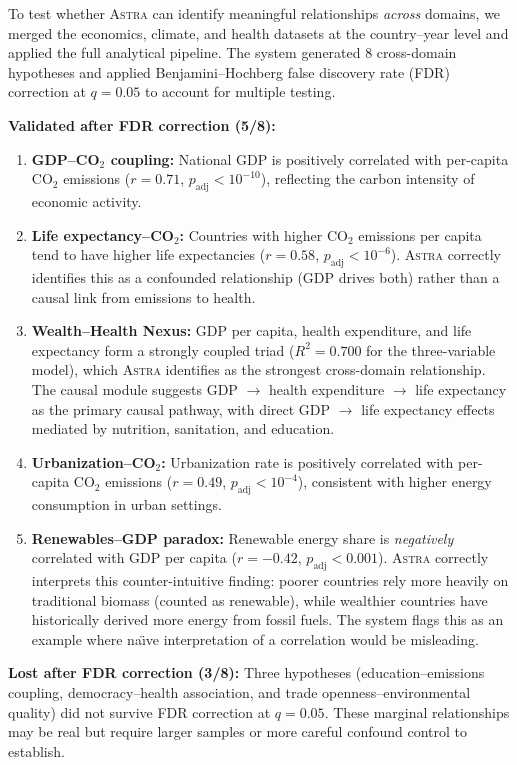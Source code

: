 \documentclass[usenatbib]{rasti}
\newcommand{\astra}{\textsc{Astra}\xspace}
\begin{document}
To test whether \astra can identify meaningful relationships \emph{across} domains, we merged the economics, climate, and health datasets at the country--year level and applied the full analytical pipeline. The system generated 8 cross-domain hypotheses and applied Benjamini--Hochberg false discovery rate (FDR) correction \citep{BenjaminiHochberg1995} at $q = 0.05$ to account for multiple testing.

\textbf{Validated after FDR correction (5/8):}
\begin{enumerate}
  \item[(i)] \textbf{GDP--CO$_{2}$ coupling:} National GDP is positively correlated with per-capita CO$_{2}$ emissions ($r = 0.71$, $p_{\mathrm{adj}} < 10^{-10}$), reflecting the carbon intensity of economic activity.
  \item[(ii)] \textbf{Life expectancy--CO$_{2}$:} Countries with higher CO$_{2}$ emissions per capita tend to have higher life expectancies ($r = 0.58$, $p_{\mathrm{adj}} < 10^{-6}$). \astra correctly identifies this as a confounded relationship (GDP drives both) rather than a causal link from emissions to health.
  \item[(iii)] \textbf{Wealth--Health Nexus:} GDP per capita, health expenditure, and life expectancy form a strongly coupled triad ($R^{2} = 0.700$ for the three-variable model), which \astra identifies as the strongest cross-domain relationship. The causal module suggests GDP $\rightarrow$ health expenditure $\rightarrow$ life expectancy as the primary causal pathway, with direct GDP $\rightarrow$ life expectancy effects mediated by nutrition, sanitation, and education.
  \item[(iv)] \textbf{Urbanization--CO$_{2}$:} Urbanization rate is positively correlated with per-capita CO$_{2}$ emissions ($r = 0.49$, $p_{\mathrm{adj}} < 10^{-4}$), consistent with higher energy consumption in urban settings.
  \item[(v)] \textbf{Renewables--GDP paradox:} Renewable energy share is \emph{negatively} correlated with GDP per capita ($r = -0.42$, $p_{\mathrm{adj}} < 0.001$). \astra correctly interprets this counter-intuitive finding: poorer countries rely more heavily on traditional biomass (counted as renewable), while wealthier countries have historically derived more energy from fossil fuels. The system flags this as an example where na\"{\i}ve interpretation of a correlation would be misleading.
\end{enumerate}

\textbf{Lost after FDR correction (3/8):}
Three hypotheses (education--emissions coupling, democracy--health association, and trade openness--environmental quality) did not survive FDR correction at $q = 0.05$. These marginal relationships may be real but require larger samples or more careful confound control to establish.
\end{document}
